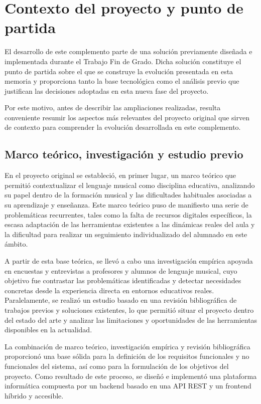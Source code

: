\chapter{Contexto del proyecto y punto de partida}
\label{chap:contexto}
El desarrollo de este complemento parte de una solución previamente diseñada e implementada durante el Trabajo Fin de Grado. Dicha solución constituye el punto de partida sobre el que se construye la evolución presentada en esta memoria y proporciona tanto la base tecnológica como el análisis previo que justifican las decisiones adoptadas en esta nueva fase del proyecto.

Por este motivo, antes de describir las ampliaciones realizadas, resulta conveniente resumir los aspectos más relevantes del proyecto original que sirven de contexto para comprender la evolución desarrollada en este complemento.
\section{Marco teórico, investigación y estudio previo}
En el proyecto original se estableció, en primer lugar, un marco teórico que permitió contextualizar el lenguaje musical como disciplina educativa, analizando su papel dentro de la formación musical y las dificultades habituales asociadas a su aprendizaje y enseñanza. Este marco teórico puso de manifiesto una serie de problemáticas recurrentes, tales como la falta de recursos digitales específicos, la escasa adaptación de las herramientas existentes a las dinámicas reales del aula y la dificultad para realizar un seguimiento individualizado del alumnado en este ámbito.

A partir de esta base teórica, se llevó a cabo una investigación empírica apoyada en encuestas y entrevistas a profesores y alumnos de lenguaje musical, cuyo objetivo fue contrastar las problemáticas identificadas y detectar necesidades concretas desde la experiencia directa en entornos educativos reales. Paralelamente, se realizó un estudio basado en una revisión bibliográfica de trabajos previos y soluciones existentes, lo que permitió situar el proyecto dentro del estado del arte y analizar las limitaciones y oportunidades de las herramientas disponibles en la actualidad.

La combinación de marco teórico, investigación empírica y revisión bibliográfica proporcionó una base sólida para la definición de los requisitos funcionales y no funcionales del sistema, así como para la formulación de los objetivos del proyecto. Como resultado de este proceso, se diseñó e implementó una plataforma informática compuesta por un backend basado en una API REST y un frontend híbrido y accesible.
